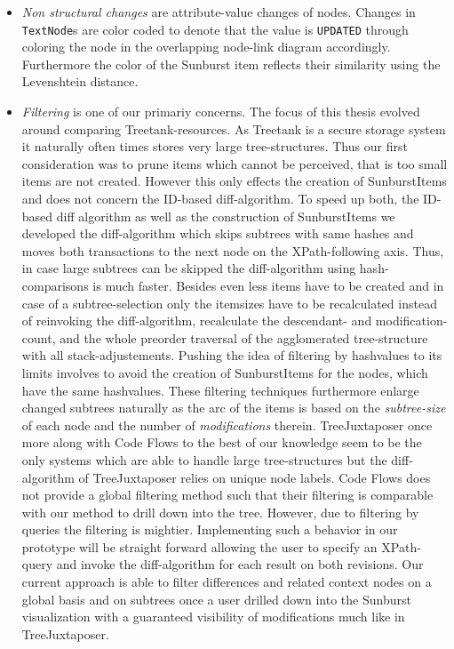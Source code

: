 \begin{itemize}
\item \emph{Non structural changes} are attribute-value changes of nodes. Changes in \texttt{TextNode}s are color coded to denote that the value is \texttt{UPDATED} through coloring the node in the overlapping node-link diagram accordingly. Furthermore the color of the Sunburst item reflects their similarity using the Levenshtein distance.
\item \emph{Filtering} is one of our primariy concerns. The focus of this thesis evolved around comparing Treetank-resources. As Treetank is a secure storage system it naturally often times stores very large tree-structures. Thus our first consideration was to prune items which cannot be perceived, that is too small items are not created. However this only effects the creation of SunburstItems and does not concern the ID-based diff-algorithm. To speed up both, the ID-based diff algorithm as well as the construction of SunburstItems we developed the diff-algorithm which skips subtrees with same hashes and moves both transactions to the next node on the XPath-following axis. Thus, in case large subtrees can be skipped the diff-algorithm using hash-comparisons is much faster. Besides even less items have to be created and in case of a subtree-selection only the itemsizes have to be recalculated instead of reinvoking the diff-algorithm, recalculate the descendant- and modification-count, and the whole preorder traversal of the agglomerated tree-structure with all stack-adjustements. Pushing the idea of filtering by hashvalues to its limits involves to avoid the creation of SunburstItems for the nodes, which have the same hashvalues. These filtering techniques furthermore enlarge changed subtrees naturally as the arc of the items is based on the \emph{subtree-size} of each node and the number of \emph{modifications} therein. TreeJuxtaposer once more along with Code Flows to the best of our knowledge seem to be the only systems which are able to handle large tree-structures but the diff-algorithm of TreeJuxtaposer relies on unique node labels. Code Flows does not provide a global filtering method such that their filtering is comparable with our method to drill down into the tree. However, due to filtering by queries the filtering is mightier. Implementing such a behavior in our prototype will be straight forward allowing the user to specify an XPath-query and invoke the diff-algorithm for each result on both revisions. Our current approach is able to filter differences and related context nodes on a global basis and on subtrees once a user drilled down into the Sunburst visualization with a guaranteed visibility of modifications much like in TreeJuxtaposer.
\end{itemize}

